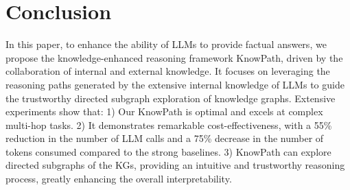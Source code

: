 \section{Conclusion}

In this paper, to enhance the ability of LLMs to provide factual answers, we propose the knowledge-enhanced reasoning framework KnowPath, driven by the collaboration of internal and external knowledge.
It focuses on leveraging the reasoning paths generated by the extensive internal knowledge of LLMs to guide the trustworthy directed subgraph exploration of knowledge graphs.
Extensive experiments show that:
1) Our KnowPath is optimal and excels at complex multi-hop tasks.
2) It demonstrates remarkable cost-effectiveness, with a 55\% reduction in the number of LLM calls and a 75\% decrease in the number of tokens consumed compared to the strong baselines.
3) KnowPath can explore directed subgraphs of the KGs, providing an intuitive and trustworthy reasoning process, greatly enhancing the overall interpretability.